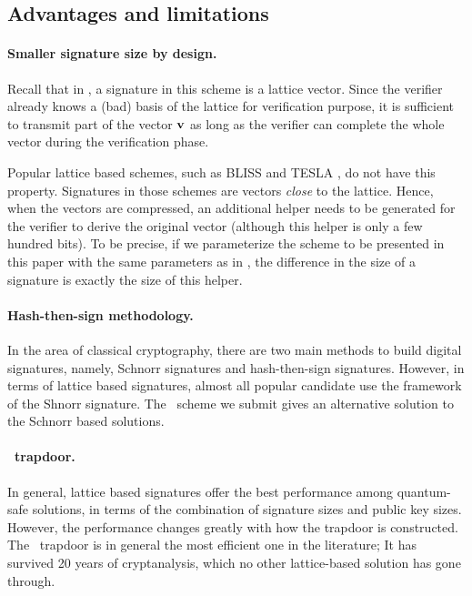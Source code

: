 \documentclass{llncs}
\newcommand{\bfv}{{\bf v}}
\newcommand{\pqntrusign}{{\sf{pqNTRUSign}}}
\newcommand{\ntru}{{\sf{NTRU}}}
\newcommand{\<}{\langle}
\renewcommand{\>}{\rangle}
\begin{document}
\subsection{Advantages and limitations}
\paragraph{Smaller signature size by design.}

Recall that in \cite{DBLP:conf/pqcrypto/HoffsteinPSSW14},
 a signature in this scheme is a lattice vector.
Since the verifier already knows a (bad) basis of the lattice for
verification purpose, it is sufficient to transmit part of the vector
$\bfv$ as long as the verifier can complete the whole vector during 
the verification phase.

Popular lattice based schemes, such as BLISS \cite{DBLP:conf/crypto/DucasDLL13} and TESLA \cite{DBLP:journals/iacr/AlkimBBD15}, do not 
have this property. Signatures in those schemes are vectors 
{\em close} to the lattice. Hence, when the vectors are compressed,
an additional helper needs to be generated for the verifier to 
derive the original vector (although this helper is only a few
hundred bits). To be precise, if we parameterize the scheme to be 
presented in this paper with the same parameters as  in \cite{DBLP:conf/crypto/DucasDLL13},
the difference in the size of a signature is exactly the size
of this helper.
\paragraph{Hash-then-sign methodology.}
In the area of classical cryptography,
there are two main methods to build digital signatures, namely,
 Schnorr signatures and hash-then-sign signatures.
However, in terms of lattice based signatures,
almost all popular candidate use the framework of
the Shnorr signature. 
The \pqntrusign~scheme we submit gives an alternative solution to
the Schnorr based solutions.

\paragraph{\ntru~trapdoor.}
In general, lattice based signatures offer the best performance among quantum-safe solutions, in terms of the combination of signature 
sizes and public key sizes. However, the performance changes greatly 
with how the trapdoor is constructed. The \ntru~trapdoor is in 
general the most efficient one in the literature;  It has survived
20 years of cryptanalysis, which no other lattice-based solution 
has gone through.
\end{document}
